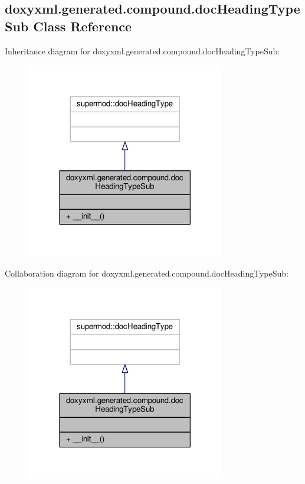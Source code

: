 \subsection{doxyxml.\+generated.\+compound.\+doc\+Heading\+Type\+Sub Class Reference}
\label{classdoxyxml_1_1generated_1_1compound_1_1docHeadingTypeSub}


Inheritance diagram for doxyxml.\+generated.\+compound.\+doc\+Heading\+Type\+Sub\+:
\nopagebreak
\begin{figure}[H]
\begin{center}
\leavevmode
\includegraphics[width=246pt]{d9/dde/classdoxyxml_1_1generated_1_1compound_1_1docHeadingTypeSub__inherit__graph}
\end{center}
\end{figure}


Collaboration diagram for doxyxml.\+generated.\+compound.\+doc\+Heading\+Type\+Sub\+:
\nopagebreak
\begin{figure}[H]
\begin{center}
\leavevmode
\includegraphics[width=246pt]{d3/d7c/classdoxyxml_1_1generated_1_1compound_1_1docHeadingTypeSub__coll__graph}
\end{center}
\end{figure}
